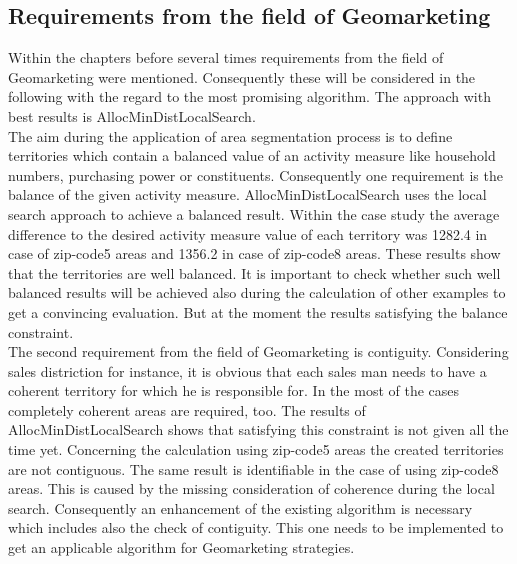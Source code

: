 \subsection{Requirements from the field of Geomarketing}
Within the chapters before several times requirements from the field of Geomarketing were mentioned. Consequently these will be considered in the following with the regard to the most promising algorithm. The approach with best results is AllocMinDistLocalSearch. \\
The aim during the application of area segmentation process is to define territories which contain a balanced value of an activity measure like household numbers, purchasing power or constituents. Consequently one requirement is the balance of the given activity measure. AllocMinDistLocalSearch uses the local search approach to achieve a balanced result. Within the case study the average difference to the desired activity measure value of each territory was 1282.4 in case of zip-code5 areas and 1356.2 in case of zip-code8 areas. These results show that the territories are well balanced. It is important to check whether such well balanced results will be achieved also during the calculation of other examples to get a convincing evaluation. But at the moment the results satisfying the balance constraint.\\
The second requirement from the field of Geomarketing is contiguity. Considering sales distriction for instance, it is obvious that each sales man needs to have a coherent territory for which he is responsible for. In the most of the cases completely coherent areas are required, too. The results of AllocMinDistLocalSearch shows that satisfying this constraint is not given all the time yet. Concerning the calculation using zip-code5 areas the created territories are not contiguous. The same result is identifiable in the case of using zip-code8 areas. This is caused by the missing consideration of coherence during the local search. Consequently an enhancement of the existing algorithm is necessary which includes also the check of contiguity. This one needs to be implemented to get an applicable algorithm for Geomarketing strategies. \\
